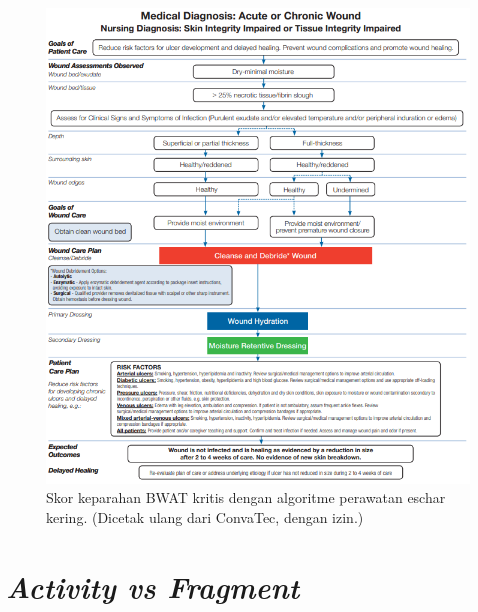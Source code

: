 \begin{figure}[H]
	\centering
	\includegraphics[keepaspectratio, width=14cm]{gambar/gambar_28}
	\caption{Skor keparahan BWAT kritis dengan algoritme perawatan eschar kering. (Dicetak ulang dari ConvaTec, dengan izin.) \citep{sussman2012}}
	\label{gambar:gambar_28}
\end{figure}

\section{\emph{Activity vs Fragment}}

